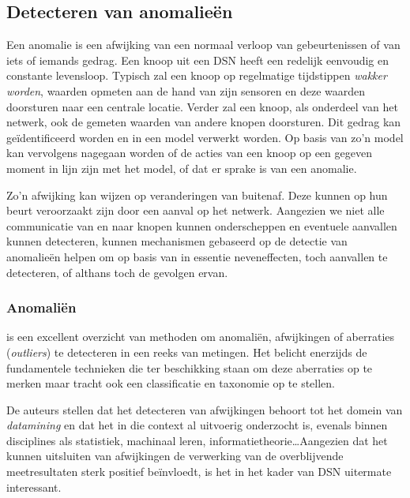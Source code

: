 
\subsection{Detecteren van anomalie\"en}
\label{subsection:anomaly}

Een anomalie is een afwijking van een normaal verloop van gebeurtenissen of van
iets of iemands gedrag. Een knoop uit een DSN heeft een redelijk eenvoudig en
constante levensloop. Typisch zal een knoop op regelmatige tijdstippen
\emph{wakker worden}, waarden opmeten aan de hand van zijn sensoren en deze
waarden doorsturen naar een centrale locatie. Verder zal een knoop, als
onderdeel van het netwerk, ook de gemeten waarden van andere knopen doorsturen.
Dit gedrag kan ge\"identificeerd worden en in een model verwerkt worden. Op
basis van zo'n model kan vervolgens nagegaan worden of de acties van een knoop
op een gegeven moment in lijn zijn met het model, of dat er sprake is van een
anomalie.

Zo'n afwijking kan wijzen op veranderingen van buitenaf. Deze kunnen op hun
beurt veroorzaakt zijn door een aanval op het netwerk. Aangezien we niet alle
communicatie van en naar knopen kunnen onderscheppen en eventuele aanvallen
kunnen detecteren, kunnen mechanismen gebaseerd op de detectie van anomalie\"en
helpen om op basis van in essentie neveneffecten, toch aanvallen te detecteren,
of althans toch de gevolgen ervan.

\subsubsection*{Anomali\"en}
\label{subsubsection:outlier}

\citep{zhang2010outlier} is een excellent overzicht van methoden om
anomali\"en, afwijkingen of aberraties (\emph{outliers}) te detecteren in een
reeks van metingen. Het belicht enerzijds de fundamentele technieken die ter
beschikking staan om deze aberraties op te merken maar tracht ook een
classificatie en taxonomie op te stellen.

De auteurs stellen dat het detecteren van afwijkingen behoort tot het domein
van \emph{datamining} en dat het in die context al uitvoerig onderzocht is,
evenals binnen disciplines als statistiek, machinaal leren,
informatietheorie\dots Aangezien dat het kunnen uitsluiten van afwijkingen de
verwerking van de overblijvende meetresultaten sterk positief be\"invloedt, is
het in het kader van DSN uitermate interessant.

